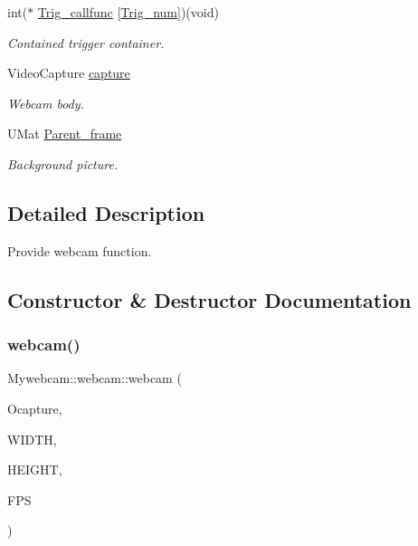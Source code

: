 \begin{DoxyCompactItemize}
\mbox{\label{class_mywebcam_1_1webcam_a600fe62ad1eb3b8242cb2ede9456ad99}} 
int($\ast$ \hyperlink{class_mywebcam_1_1webcam_a600fe62ad1eb3b8242cb2ede9456ad99}{Trig\+\_\+callfunc} \mbox{[}\hyperlink{group___the_ga3572c6451d34aaf557cfb88ee365cf16}{Trig\+\_\+num}\mbox{]})(void)
\begin{DoxyCompactList}\small\item\em Contained trigger container. \end{DoxyCompactList}\item 
\mbox{\label{class_mywebcam_1_1webcam_a2bc41a9fdf9816b6e88350340bbdb967}} 
Video\+Capture \hyperlink{class_mywebcam_1_1webcam_a2bc41a9fdf9816b6e88350340bbdb967}{capture}
\begin{DoxyCompactList}\small\item\em Webcam body. \end{DoxyCompactList}\item 
\mbox{\label{class_mywebcam_1_1webcam_af3752d85caf594423e13cd40821f31a7}} 
U\+Mat \hyperlink{class_mywebcam_1_1webcam_af3752d85caf594423e13cd40821f31a7}{Parent\+\_\+frame}
\begin{DoxyCompactList}\small\item\em Background picture. \end{DoxyCompactList}\end{DoxyCompactItemize}


\subsection{Detailed Description}
Provide webcam function. 

\subsection{Constructor \& Destructor Documentation}
\mbox{\label{class_mywebcam_1_1webcam_a90ece1aab671095ee01fa9c34fa4dbd7}} 
\subsubsection{\texorpdfstring{webcam()}{webcam()}}
{\footnotesize\ttfamily Mywebcam\+::webcam\+::webcam (\begin{DoxyParamCaption}\item[{Video\+Capture}]{Ocapture,  }\item[{int}]{W\+I\+D\+TH,  }\item[{int}]{H\+E\+I\+G\+HT,  }\item[{int}]{F\+PS }\end{DoxyParamCaption})\hspace{0.3cm}{\ttfamily [inline]}}



